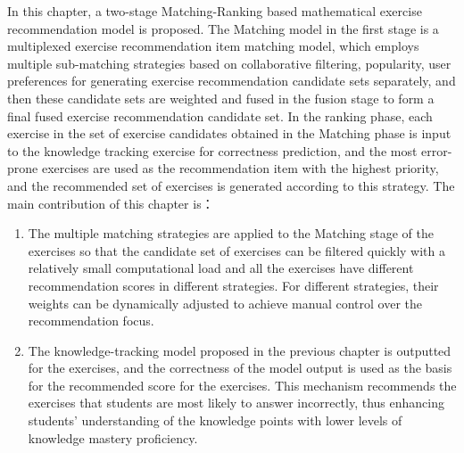 In this chapter, a two-stage Matching-Ranking based mathematical exercise recommendation model is proposed. The Matching model in the first stage is a multiplexed exercise recommendation item matching model, which employs multiple sub-matching strategies based on collaborative filtering, popularity, user preferences for generating exercise recommendation candidate sets separately, and then these candidate sets are weighted and fused in the fusion stage to form a final fused exercise recommendation candidate set. In the ranking phase, each exercise in the set of exercise candidates obtained in the Matching phase is input to the knowledge tracking exercise for correctness prediction, and the most error-prone exercises are used as the recommendation item with the highest priority, and the recommended set of exercises is generated according to this strategy.
The main contribution of this chapter is：
\begin{enumerate}
  \item The multiple matching strategies are applied to the Matching stage of the exercises so that the candidate set of exercises can be filtered quickly with a relatively small computational load and all the exercises have different recommendation scores in different strategies. For different strategies, their weights can be dynamically adjusted to achieve manual control over the recommendation focus.
  \item The knowledge-tracking model proposed in the previous chapter is outputted for the exercises, and the correctness of the model output is used as the basis for the recommended score for the exercises. This mechanism recommends the exercises that students are most likely to answer incorrectly, thus enhancing students' understanding of the knowledge points with lower levels of knowledge mastery proficiency.
\end{enumerate}